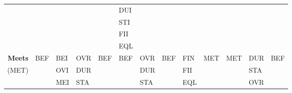 \documentclass[11pt]{report}
\newenvironment{vvarmargin}[2]
{
  \begin{list}{}
  {
    \setlength{\topsep}{0pt}
    \setlength{\leftmargin}{0pt}
    \setlength{\rightmargin}{0pt}
    \setlength{\listparindent}{\parindent}
    \setlength{\itemindent}{\parindent}
    \setlength{\parsep}{0pt plus 1pt}
    \addtolength{\leftmargin}{#1}\addtolength{\rightmargin}{#2}
  }
  \item
}
{
  \end{list}
}
\begin{document}
\begin{table}[p]
\begin{vvarmargin}{-4cm}{-4cm}
\begin{center}
\begin{tabular}[t]{|r|l|l|l|l|l|l|l|l|l|l|l|l|}
                                        &                         &                         &                         &                         & DUI                     &                         &                         &                         &                         &                         &                         &                         \\
                                        &                         &                         &                         &                         & STI                     &                         &                         &                         &                         &                         &                         &                         \\
                                        &                         &                         &                         &                         & FII                     &                         &                         &                         &                         &                         &                         &                         \\
                                        &                         &                         &                         &                         & EQL                     &                         &                         &                         &                         &                         &                         &                         \\
                \hline
                \textbf{Meets}          & BEF                     & BEI                     & OVR                     & BEF                     & BEF                     & OVR                     & BEF                     & FIN                     & MET                     & MET                     & DUR                     & BEF                     \\
                (MET)                   &                         & OVI                     & DUR                     &                         &                         & DUR                     &                         & FII                     &                         &                         & STA                     &                         \\
                                        &                         & MEI                     & STA                     &                         &                         & STA                     &                         & EQL                     &                         &                         & OVR                     &                         \\

\end{tabular}
\end{center}
\end{vvarmargin}
\end{table}
\end{document}
